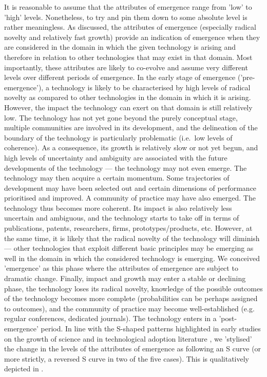 \documentclass[11pt]{article}
\begin{document}
It is reasonable to assume that the attributes of emergence range from 'low' to 'high' levels. Nonetheless, to try and pin them down to some absolute level is rather meaningless. As discussed, the attributes of emergence (especially radical novelty and relatively fast growth) provide an indication of emergence when they are considered in the domain in which the given technology is arising and therefore in relation to other technologies that may exist in that domain. Most importantly, these attributes are likely to co-evolve and assume very different levels over different periods of emergence. In the early stage of emergence ('pre-emergence'), a technology is likely to be characterised by high levels of radical novelty as compared to other technologies in the domain in which it is arising. However, the impact the technology can exert on that domain is still relatively low. The technology has not yet gone beyond the purely conceptual stage, multiple communities are involved in its development, and the delineation of the boundary of the technology is particularly problematic (i.e.\ low levels of coherence). As a consequence, its growth is relatively slow or not yet begun, and high levels of uncertainty and ambiguity are associated with the future developments of the technology --- the technology may not even emerge. The technology may then acquire a certain momentum. Some trajectories of development may have been selected out and certain dimensions of performance prioritised and improved. A community of practice may have also emerged. The technology thus becomes more coherent. Its impact is also relatively less uncertain and ambiguous, and the technology starts to take off in terms of publications, patents, researchers, firms, prototypes/products, etc. However, at the same time, it is likely that the radical novelty of the technology will diminish --- other technologies that exploit different basic principles may be emerging as well in the domain in which the considered technology is emerging. We conceived 'emergence' as this phase where the attributes of emergence are subject to dramatic change. Finally, impact and growth may enter a stable or declining phase, the technology loses its radical novelty, knowledge of the possible outcomes of the technology becomes more complete (probabilities can be perhaps assigned to outcomes), and the community of practice may become well-established (e.g. regular conferences, dedicated journals). The technology enters in a 'post-emergence' period. In line with the S-shaped patterns highlighted in early studies on the growth of science \citep[e.g][]{DeSollaPrice1963} and in technological adoption literature \citep[e.g.][]{Mansfield1961,Rogers1962}, we 'stylised' the change in the levels of the attributes of emergence as following an S curve (or more strictly, a reversed S curve in two of the five cases). This is qualitatively depicted in .  
\end{document}
